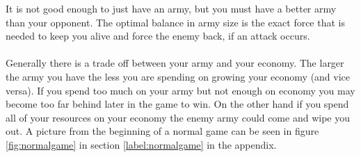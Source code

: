 	It is not good enough to just have an army, but you must have a better army than your opponent.
	The optimal balance in army size is the exact force that is needed to keep you alive and force the enemy back, if an attack occurs.
\\
\\	
	Generally there is a trade off between your army and your economy. 
	The larger the army you have the less you are spending on growing your economy (and vice versa). 
	If you spend too much on your army but not enough on economy you may become too far behind later in the game to win. 
	On the other hand if you spend all of your resources on your economy the enemy army could come and wipe you out. A picture from the beginning of a normal game can be seen in figure \ref{fig:normalgame} in section \ref{label:normalgame} in the appendix.\\

 